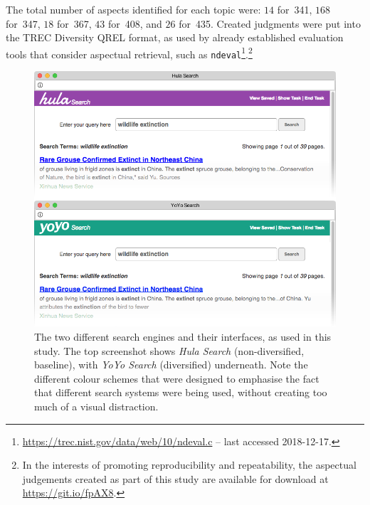 The total number of aspects identified for each topic were: $14$ for~341, $168$ for~347, $18$ for~367, $43$ for~408, and $26$ for~435. Created judgments were put into the TREC Diversity QREL format, as used by already established evaluation tools that consider aspectual retrieval, such as \texttt{ndeval}\footnote{\url{https://trec.nist.gov/data/web/10/ndeval.c} -- last accessed 2018-12-17.}.\footnote{In the interests of promoting reproducibility and repeatability, the aspectual judgements created as part of this study are available for download at \url{https://git.io/fpAX8}.} %


\begin{figure}[t!]
\includegraphics[width=1.0\columnwidth]{figures/interface-both.png}
\caption{The two different search engines and their interfaces, as used in this study. The top screenshot shows \emph{Hula Search} (non-diversified, baseline), with \emph{YoYo Search} (diversified) underneath. Note the different colour schemes that were designed to emphasise the fact that different search systems were being used, without creating too much of a visual distraction.
} 
\label{fig_systems}
\end{figure}

